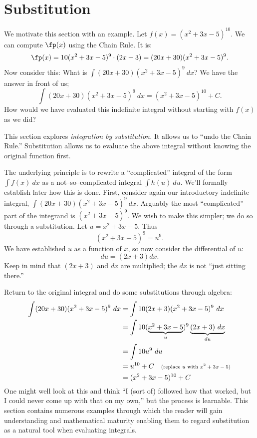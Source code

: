 \section{Substitution}\label{sec:substitution}

We motivate this section with an example. Let $f(x) = (x^2+3x-5)^{10}$. We can compute $\fp(x)$ using the Chain Rule. It is:
	$$\fp(x) = 10(x^2+3x-5)^9\cdot(2x+3) = (20x+30)(x^2+3x-5)^9.$$
Now consider this: What is $\int (20x+30)(x^2+3x-5)^9\ dx$? We have the answer in front of us; $$\int (20x+30)(x^2+3x-5)^9\ dx = (x^2+3x-5)^{10}+C.$$
How would we have evaluated this indefinite integral without starting with $f(x)$ as we did?

This section explores \textit{integration by substitution.} It allows us to ``undo the Chain Rule.'' Substitution allows us to evaluate the above integral without knowing the original function first.

The underlying principle is to rewrite a ``complicated'' integral of the form $\int f(x)\ dx$ as a not--so--complicated integral $\int h(u)\ du$. We'll formally establish later how this is done. First, consider again our introductory indefinite integral, $\int (20x+30)(x^2+3x-5)^9\ dx$. Arguably the most ``complicated'' part of the integrand is $(x^2+3x-5)^9$. We wish to make this simpler; we do so through a substitution. Let $u=x^2+3x-5$. Thus $$(x^2+3x-5)^9 = u^9.$$
We have established $u$ as a function of $x$, so now consider the differential of $u$: $$du = (2x+3)dx.$$ Keep in mind that $(2x+3)$ and $dx$ are multiplied; the $dx$ is not ``just sitting there.''

Return to the original integral and do some substitutions through algebra:
\begin{align*}
	\int (20x+30)(x^2+3x-5)^9\ dx
	&=	\int 10(2x+3)(x^2+3x-5)^9\ dx \\
	&=\int 10(\underbrace{x^2+3x-5}_u)^9\underbrace{(2x+3)\ dx}_{du} \\
	&=\int 10u^9\ du \\
	&= u^{10} + C \quad \text{\scriptsize (replace $u$ with $x^2+3x-5$)}\\
	&= (x^2+3x-5)^{10} +C
\end{align*}
One might well look at this and think ``I (sort of) followed how that worked, but I could never come up with that on my own,'' but the process is learnable. This section contains numerous examples through which the reader will gain understanding and mathematical maturity enabling them to regard substitution as a natural tool when evaluating integrals.

